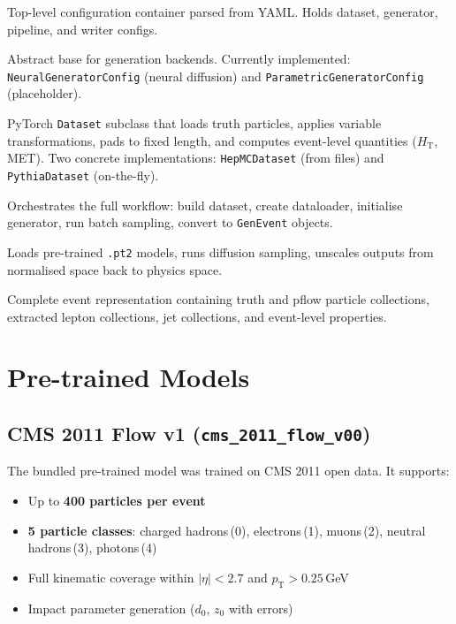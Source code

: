 \documentclass[11pt,a4paper]{article}
\begin{document}
\begin{description}[style=nextline,leftmargin=0pt]
  \item[\texttt{Config}] Top-level configuration container parsed from YAML.
    Holds dataset, generator, pipeline, and writer configs.
  \item[\texttt{GeneratorConfig}] Abstract base for generation backends. Currently
    implemented: \texttt{NeuralGeneratorConfig} (neural diffusion) and
    \texttt{ParametricGeneratorConfig} (placeholder).
  \item[\texttt{BaseDataset}] PyTorch \texttt{Dataset} subclass that loads truth
    particles, applies variable transformations, pads to fixed length, and computes
    event-level quantities ($H_\mathrm{T}$, MET). Two concrete implementations:
    \texttt{HepMCDataset} (from files) and \texttt{PythiaDataset} (on-the-fly).
  \item[\texttt{GenerationPipeline}] Orchestrates the full workflow: build dataset,
    create dataloader, initialise generator, run batch sampling, convert to
    \texttt{GenEvent} objects.
  \item[\texttt{NeuralEventGenerator}] Loads pre-trained \texttt{.pt2} models,
    runs diffusion sampling, unscales outputs from normalised space back to
    physics space.
  \item[\texttt{GenEvent}] Complete event representation containing truth and pflow
    particle collections, extracted lepton collections, jet collections, and
    event-level properties.
\end{description}

\section{Pre-trained Models}
\label{sec:pretrained}

\subsection{CMS 2011 Flow v1 (\texttt{cms\_2011\_flow\_v00})}

The bundled pre-trained model was trained on CMS 2011 open data. It supports:

\begin{itemize}
  \item Up to \textbf{400 particles per event}
  \item \textbf{5 particle classes}: charged hadrons\,(0), electrons\,(1), muons\,(2),
    neutral hadrons\,(3), photons\,(4)
  \item Full kinematic coverage within $|\eta| < 2.7$ and $p_\mathrm{T} > 0.25$\,GeV
  \item Impact parameter generation ($d_0$, $z_0$ with errors)
\end{itemize}
\end{document}
